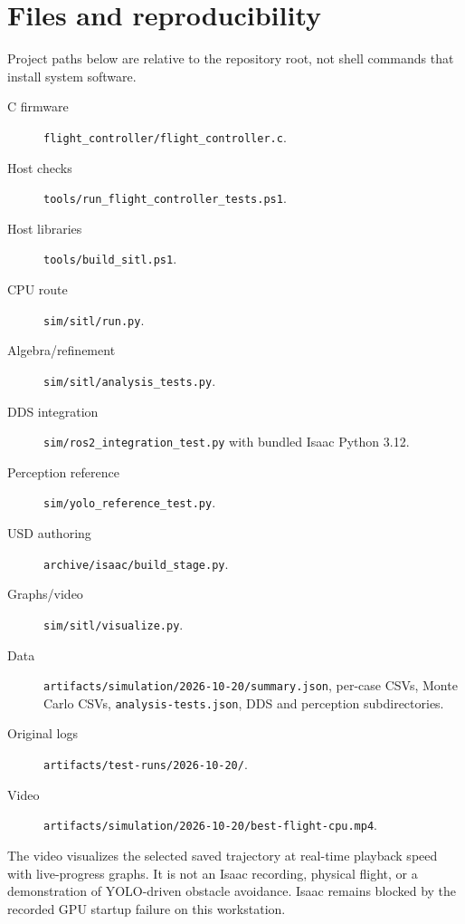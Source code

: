\section{Files and reproducibility}
Project paths below are relative to the repository root, not shell commands
that install system software.
\begin{description}
\item[C firmware] \texttt{flight\_controller/flight\_controller.c}.
\item[Host checks] \texttt{tools/run\_flight\_controller\_tests.ps1}.
\item[Host libraries] \texttt{tools/build\_sitl.ps1}.
\item[CPU route] \texttt{sim/sitl/run.py}.
\item[Algebra/refinement] \texttt{sim/sitl/analysis\_tests.py}.
\item[DDS integration] \texttt{sim/ros2\_integration\_test.py} with bundled Isaac Python 3.12.
\item[Perception reference] \texttt{sim/yolo\_reference\_test.py}.
\item[USD authoring] \texttt{archive/isaac/build\_stage.py}.
\item[Graphs/video] \texttt{sim/sitl/visualize.py}.
\item[Data] \texttt{artifacts/simulation/2026-10-20/summary.json}, per-case CSVs,
Monte Carlo CSVs, \texttt{analysis-tests.json}, DDS and perception subdirectories.
\item[Original logs] \texttt{artifacts/test-runs/2026-10-20/}.
\item[Video] \texttt{artifacts/simulation/2026-10-20/best-flight-cpu.mp4}.
\end{description}
The video visualizes the selected saved trajectory at real-time playback speed
with live-progress graphs. It is not an Isaac recording, physical flight,
or a demonstration of YOLO-driven obstacle avoidance. Isaac remains blocked
by the recorded GPU startup failure on this workstation.
